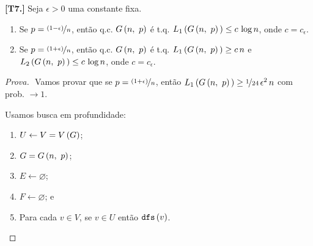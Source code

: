 \begin{teorema}
  \normalfont\textbf{[T7.]}
  Seja $\epsilon>0$ uma constante fixa.
  \begin{enumerate}
    \item Se $p=\nicefrac{\left(1-\epsilon\vphantom{1j}\right)}{n}$, então q.c. $G\left(n,\ p\vphantom{1j}\right)$ é t.q. $L_1\left(G\left(n,\ p\vphantom{1j}\right)\vphantom{1j}\right)\leq c\,\log n$, onde $c=c_\epsilon$.
    \item Se $p=\nicefrac{\left(1+\epsilon\vphantom{1j}\right)}{n}$, então q.c. $G\left(n,\ p\vphantom{1j}\right)$ é t.q. $L_1\left(G\left(n,\ p\vphantom{1j}\right)\vphantom{1j}\right)\geq c\,n$ e $L_2\left(G\left(n,\ p\vphantom{1j}\right)\vphantom{1j}\right)\leq c\,\log n$, onde $c=c_\epsilon$.
  \end{enumerate}
\end{teorema}

\begin{proof}[Prova]$ $\newline
  Vamos provar que se $p=\nicefrac{\left(1+\epsilon\vphantom{1j}\right)}{n}$, então $L_1\left(G\left(n,\ p\vphantom{1j}\right)\vphantom{1j}\right)\geq\nicefrac{1}{24}\,\epsilon^2\,n$ com prob. $\rightarrow1$.

  Usamos busca em profundidade:
  \begin{enumerate}
    \item $U\leftarrow V=V\left(G\vphantom{1j}\right)$;
    \item $G=G\left(n,\ p\vphantom{1j}\right)$;
    \item $E\leftarrow\varnothing$;
    \item $F\leftarrow\varnothing$; e
    \item Para cada $v\in V$, se $v\in U$ então $\texttt{dfs}\left(v\vphantom{1j}\right)$.
  \end{enumerate}
\end{proof}

